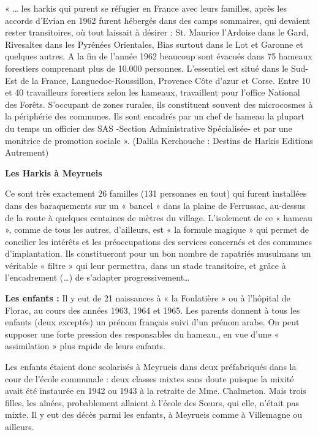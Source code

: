 « … les harkis qui purent se réfugier en France avec leurs familles, après les accords
d’Evian en 1962 furent hébergés dans des camps sommaires, qui devaient rester
transitoires, où tout laissait à désirer : St. Maurice l’Ardoise dans le Gard, Rivesaltes
dans les Pyrénées Orientales, Bias surtout dans le Lot et Garonne et quelques autres.
A la fin de l’année 1962 beaucoup sont évacués dans 75 hameaux forestiers
comprenant plus de 10.000 personnes. L’essentiel est situé dans le Sud-Est de la
France, Languedoc-Roussillon, Provence Côte d’azur et Corse. Entre 10 et 40
travailleurs forestiers selon les hameaux, travaillent pour l’office National des
Forêts. S’occupant de zones rurales, ils constituent souvent des microcosmes à la
périphérie des communes. Ils sont encadrés par un chef de hameau la plupart du temps
un officier des SAS -Section Administrative Spécialisée- et par une monitrice de promotion
sociale ». (Dalila Kerchouche : Destins de Harkis Editions Autrement)

\textbf{Les Harkis à Meyrueis}

Ce sont très exactement 26 familles (131 personnes en tout) qui furent installées dans
des baraquements sur un « bancel » dans la plaine de Ferrussac, au-dessus de la route
à quelques centaines de mètres du village. L’isolement de ce « hameau », comme de
tous les autres, d’ailleurs, est « la formule magique » qui permet de concilier les
intérêts et les préoccupations des services concernés et des communes d’implantation.
Ils constitueront pour un bon nombre de rapatriés musulmans un véritable « filtre »
qui leur permettra, dans un stade transitoire, et grâce à l’encadrement (…) de
s’adapter progressivement…

\textbf{Les enfants :} Il y eut de 21 naissances à « la Foulatière » ou à l’hôpital de Florac, au
cours des années 1963, 1964 et 1965. Les parents donnent à tous les enfants (deux
exceptés) un prénom français suivi d’un prénom arabe. On peut supposer une forte
pression des responsables du hameau., en vue d’une « assimilation » plus rapide de
leurs enfants.

Les enfants étaient donc scolarisés à Meyrueis dans deux préfabriqués dans la cour de
l’école communale : deux classes mixtes sans doute puisque la mixité avait été
instaurée en 1942 ou 1943 à la retraite de Mme. Chalmeton.
Mais trois filles, les aînées, probablement allaient à l’école des Sœurs, qui elle, n’était
pas mixte.
Il y eut des décès parmi les enfants, à Meyrueis comme à Villemagne ou ailleurs.


